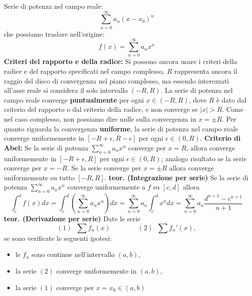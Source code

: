 \newline
Serie di potenza nel campo reale:
\[
    \sum_{n=0}^{\infty} a_n(x-x_0)^n
\]
che possiamo traslare nell'origine:
\[
    f(x) = \sum_{n=0}^{\infty} a_n x^n
\]
\newline
\textbf{Criteri del rapporto e della radice:} Si possono ancora usare i criteri della radice e del rapporto specificati nel campo complesso, $R$ rappresenta ancora il raggio del disco di convergenza nel piano complesso, ma essendo interezzati all'asse reale si considera il solo intervallo $(-R, R)$.\newline
La serie di potenza nel campo reale converge \textbf{puntualmente} per ogni $x \in (-R, R)$, dove $R$ è dato dal criterio del rapporto o dal criterio della radice, e non converge se $|x| > R$.\newline
Come nel caso complesso, non possiamo dire nulle sulla convergenza in $x = \pm R$.\newline
Per quanto riguarda la convergenza \textbf{uniforme}, la serie di potenza nel campo reale converge uniformemente in $[-R+\epsilon, R- \epsilon]$ per ogni $\epsilon \in (0,R)$.\newline
\newline
\textbf{Criterio di Abel:} Se la serie di potenza $\sum_{n=0}^{\infty} a_n x^n$ converge per $x = R$, allora converge uniformemente in $[-R + \epsilon, R]$ per ogni $\epsilon \in (0,R)$; analogo risultato se la serie converge per $x = -R$. Se la serie converge per $x = \pm R$ allora converge uniformemente su tutto $[-R, R]$.\newline
\newline
\textbf{teor. (Integrazione per serie)}\newline
Se la serie di potenza $\sum_{n=0}^{\infty} a_n x^n$ converge uniformemente a $f$ su $[c,d]$ allora
\[
    \int_{c}^{d}f(x) dx = \int_{c}^{d}\left(\sum_{n=0}^{\infty}a_n x^n\right)dx = \sum_{n=0}^{\infty}a_n \int_{c}^{d}x^n dx = \sum_{n=0}^{\infty} a_n \frac{d^{n+1}- c^{n+1}}{n+1}
\]
\newline
\textbf{teor. (Derivazione per serie)}\newline
Date le serie
\[
    (1) \;\; \sum f_n(x) \quad \quad \quad \quad (2) \;\; \sum f_n'(x),
\]
se sono verificate le seguenti ipotesi:
\begin{itemize}
    \item le $f_n$ sono continue nell'intervallo $(a,b)$,
    \item la serie $(2)$ converge uniformemente in $(a,b)$,
    \item la serie $(1)$ converge per $x = x_0 \in (a,b)$  
\end{itemize}
